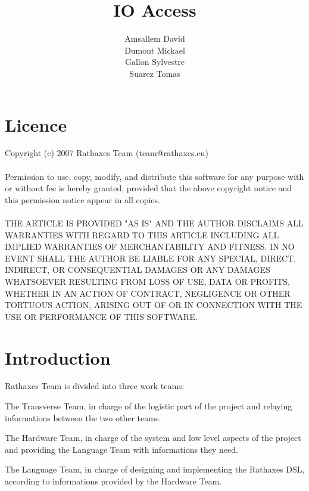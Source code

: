 \documentclass[11pt]{report}
\begin{document}
\author{Amsallem David\\Dumont Mickael\\Gallon Sylvestre\\Suarez Tomas}
\title{IO Access}
\maketitle

\section*{Licence}
Copyright (c) 2007 Rathaxes Team (team@rathaxes.eu)
\\\\
Permission to use, copy, modify, and distribute this software for any
purpose with or without fee is hereby granted, provided that the above
copyright notice and this permission notice appear in all copies.
\\\\
THE ARTICLE IS PROVIDED "AS IS" AND THE AUTHOR DISCLAIMS ALL WARRANTIES
WITH REGARD TO THIS ARTICLE INCLUDING ALL IMPLIED WARRANTIES OF
MERCHANTABILITY AND FITNESS. IN NO EVENT SHALL THE AUTHOR BE LIABLE FOR
ANY SPECIAL, DIRECT, INDIRECT, OR CONSEQUENTIAL DAMAGES OR ANY DAMAGES
WHATSOEVER RESULTING FROM LOSS OF USE, DATA OR PROFITS, WHETHER IN AN
ACTION OF CONTRACT, NEGLIGENCE OR OTHER TORTUOUS ACTION, ARISING OUT OF
OR IN CONNECTION WITH THE USE OR PERFORMANCE OF THIS SOFTWARE.
\newpage

\section*{Introduction}

Rathaxes Team is divided into three work teams:\\
\begin{description}
  \item{The Transverse Team, in charge of the logistic part of the project and
    relaying informations between the two other teams.}
  \item{The Hardware Team, in charge of the system and low level aspects of the
    project and providing the Language Team with informations they need.}
  \item{The Language Team, in charge of designing and implementing the Rathaxes
    DSL, according to informations provided by the Hardware Team.\\}
\end{description}
\end{document}
